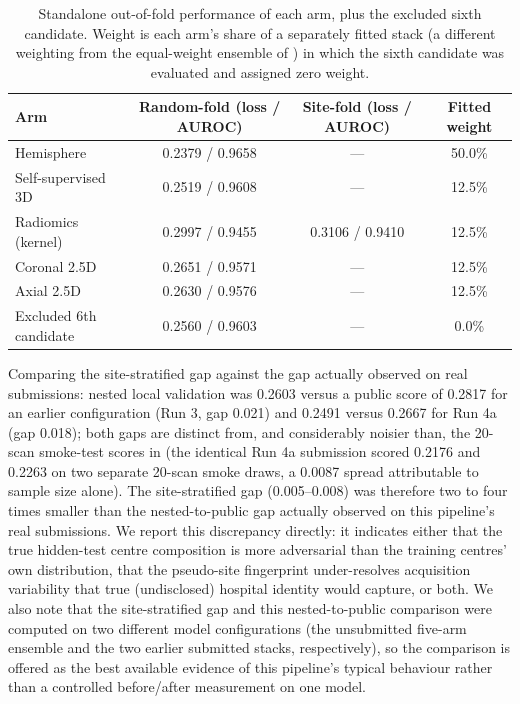 \documentclass[11pt]{article}
\begin{document}
\begin{table}[h]
\centering
\small
\caption{Standalone out-of-fold performance of each arm, plus the excluded sixth candidate. Weight is each arm's share of a separately fitted stack (a different weighting from the equal-weight ensemble of ) in which the sixth candidate was evaluated and assigned zero weight.}
\label{tab:arms}
\begin{tabular}{@{}lccc@{}}
\toprule
\textbf{Arm} & \textbf{Random-fold (loss / AUROC)} & \textbf{Site-fold (loss / AUROC)} & \textbf{Fitted weight} \\
\midrule
Hemisphere & 0.2379 / 0.9658 & --- & 50.0\% \\
Self-supervised 3D & 0.2519 / 0.9608 & --- & 12.5\% \\
Radiomics (kernel) & 0.2997 / 0.9455 & 0.3106 / 0.9410 & 12.5\% \\
Coronal 2.5D & 0.2651 / 0.9571 & --- & 12.5\% \\
Axial 2.5D & 0.2630 / 0.9576 & --- & 12.5\% \\
\midrule
Excluded 6th candidate & 0.2560 / 0.9603 & --- & 0.0\% \\
\bottomrule
\end{tabular}
\end{table}

Comparing the site-stratified gap against the gap actually observed on real submissions: nested local validation was 0.2603 versus a public score of 0.2817 for an earlier configuration (Run 3, gap 0.021) and 0.2491 versus 0.2667 for Run 4a (gap 0.018); both gaps are distinct from, and considerably noisier than, the 20-scan smoke-test scores in  (the identical Run 4a submission scored 0.2176 and 0.2263 on two separate 20-scan smoke draws, a 0.0087 spread attributable to sample size alone). The site-stratified gap (0.005--0.008) was therefore two to four times smaller than the nested-to-public gap actually observed on this pipeline's real submissions. We report this discrepancy directly: it indicates either that the true hidden-test centre composition is more adversarial than the training centres' own distribution, that the pseudo-site fingerprint under-resolves acquisition variability that true (undisclosed) hospital identity would capture, or both. We also note that the site-stratified gap and this nested-to-public comparison were computed on two different model configurations (the unsubmitted five-arm ensemble and the two earlier submitted stacks, respectively), so the comparison is offered as the best available evidence of this pipeline's typical behaviour rather than a controlled before/after measurement on one model.
\end{document}
